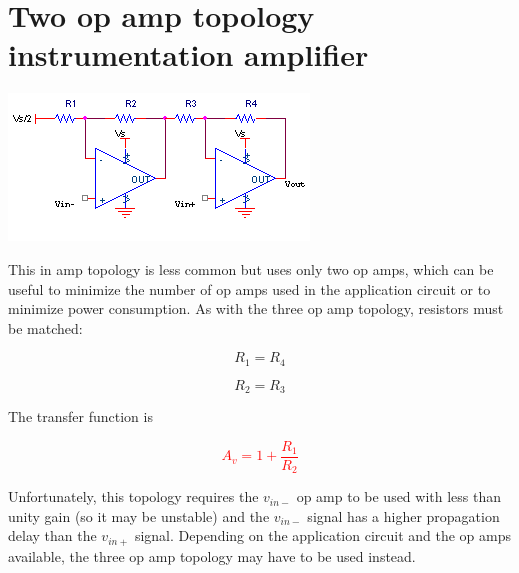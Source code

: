 \section{Two op amp topology instrumentation amplifier}
\begin{center}
	\includegraphics{schematics/twoinamp.PNG}
\end{center}
This in amp topology is less common but uses only two op amps, which can be useful to minimize the number of op amps used in the application circuit or to minimize power consumption. As with the three op amp topology, resistors must be matched:

\begin{equation}
R_{1} = R_{4}
\end{equation}

\begin{equation}
R_{2} = R_{3}
\end{equation}

\noindent The transfer function is

\textcolor{red}{
\begin{equation}
A_{v} = 1+\frac{R_{1}}{R_{2}}
\label{eq:twoinamp}
\end{equation}
}

Unfortunately, this topology requires the $v_{in-}$ op amp to be used with less than unity gain (so it may be unstable) and the $v_{in-}$ signal has a higher propagation delay than the $v_{in+}$ signal. Depending on the application circuit and the op amps available, the three op amp topology may have to be used instead.